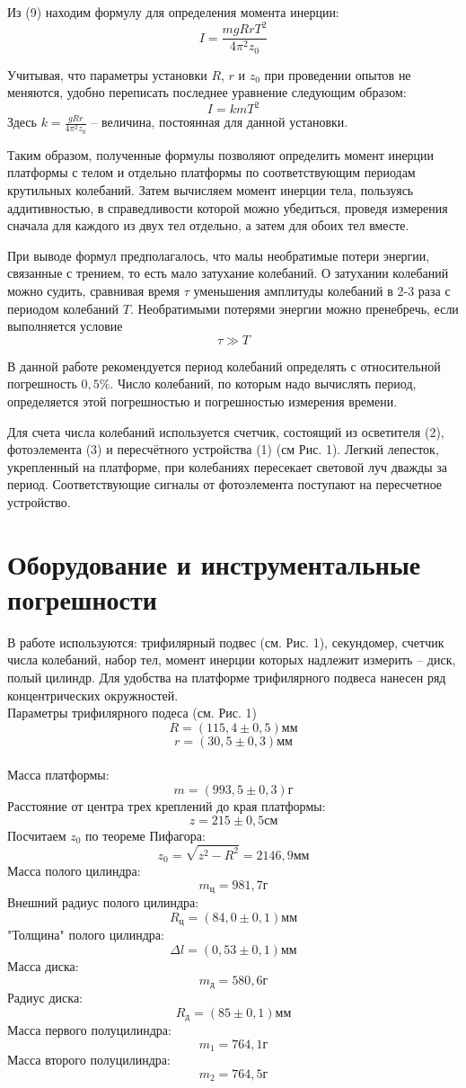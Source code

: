 \documentclass[a4paper,12pt]{article} %
\begin{document}
Из (9) находим формулу для определения момента инерции:
\begin{equation}
I = \frac{mgRrT^2}{4\pi^2z_0}
\end{equation}

Учитывая, что параметры установки $R$, $r$ и $z_0$ при проведении опытов не меняются, удобно переписать последнее уравнение следующим образом:
\begin{equation}
I = kmT^2
\end{equation}
Здесь $k = \frac{gRr}{4\pi^2z_0}$ -- величина, постоянная для данной установки.

Таким образом, полученные формулы позволяют определить момент инерции платформы с телом и отдельно платформы по соответствующим периодам крутильных колебаний. Затем вычисляем момент инерции тела, пользуясь аддитивностью, в справедливости которой можно убедиться, проведя измерения сначала для каждого из двух тел отдельно, а затем для обоих тел вместе.

При выводе формул предполагалось, что малы необратимые потери энергии, связанные с трением, то есть мало затухание колебаний. О затухании колебаний можно судить, сравнивая время $\tau$ уменьшения амплитуды колебаний в 2-3 раза с периодом колебаний $T$. Необратимыми потерями энергии можно пренебречь, если выполняется условие 
\begin{equation}
\tau \gg T
\end{equation}

В данной работе рекомендуется период колебаний определять с относительной погрешность $0,5\%$. Число колебаний, по которым надо вычислять период, определяется этой погрешностью и погрешностью измерения времени.

Для счета числа колебаний используется счетчик, состоящий из осветителя (2), фотоэлемента (3) и пересчётного устройства (1) (см Рис. 1). Легкий лепесток, укрепленный на платформе, при колебаниях пересекает световой луч дважды за период. Соответствующие сигналы от фотоэлемента поступают на пересчетное устройство.
\section{Оборудование и инструментальные погрешности}
В работе используются: трифилярный подвес (см. Рис. 1), секундомер, счетчик числа колебаний, набор тел, момент инерции которых надлежит измерить -- диск, полый цилиндр. Для удобства на платформе трифилярного подвеса нанесен ряд концентрических окружностей.\\
Параметры трифилярного подеса (см. Рис. 1)
\[ R = (115,4\pm0,5)\text{мм}\]
\[r = (30,5\pm 0,3)\text{мм}\]\\
Масса платформы:
\[m = (993,5\pm0,3)\text{г}\]
Расстояние от центра трех креплений до края платформы:
\[z = 215\pm0,5\text{см}\]
Посчитаем $z_0$ по теореме Пифагора:
\[z_0 = \sqrt{z^2 - R^2} = 2146,9\text{мм}\]
Масса полого цилиндра:
\[m_\text{ц} = 981,7\text{г}\]
Внешний радиус полого цилиндра:
\[R_\text{ц} = (84,0\pm0,1)\text{мм}\]
"Толщина" полого цилиндра:
\[\Delta l = (0,53\pm 0,1)\text{мм}\]
Масса диска:
\[m_\text{д} = 580,6\text{г}\]
Радиус диска:
\[R_\text{д} = (85\pm0,1)\text{мм}\]
Масса первого полуцилиндра:
\[m_1 = 764,1\text{г}\]
Масса второго полуцилиндра:
\[m_2 = 764,5\text{г}\]
\end{document}
